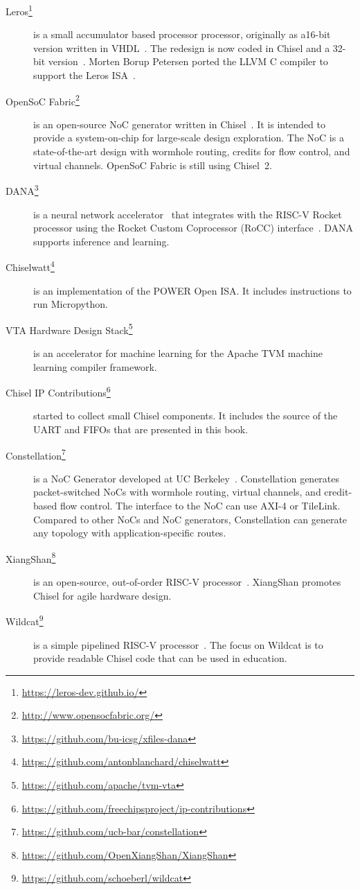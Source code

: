 \documentclass[%
    10pt,
    headinclude, footexclude,
    openright, %
    notitlepage,
    cleardoubleempty,
    headsepline,
    pointlessnumbers,
    bibtotoc, idxtotoc,
    ]{scrbook}
\newcommand{\myref}[2]{\href{#1}{#2}}
\renewcommand{\myref}[2]{{#2}{\footnote{\url{#1}}}}
\begin{document}
\begin{description}
\item[\myref{https://leros-dev.github.io/}{Leros}] is a small accumulator based processor
processor, originally as a16-bit version written in VHDL~\cite{leros:fpl2011}.
The redesign is now coded in Chisel and a 32-bit version~\cite{leros:arcs2019}.
Morten Borup Petersen ported the LLVM C compiler to support the Leros ISA~\cite{leros:comp:2019}.


\item[\myref{http://www.opensocfabric.org/}{OpenSoC Fabric}] is an open-source NoC
generator written in Chisel~\cite{OpenSoC:ispass2016}. It is intended to provide a
system-on-chip for large-scale design exploration.
The NoC is a state-of-the-art design with wormhole routing, credits for flow control, and virtual channels.
OpenSoC Fabric is still using Chisel~2.

\item[\myref{https://github.com/bu-icsg/xfiles-dana}{DANA}] is a neural network accelerator~\cite{eldridge2015}
that integrates with the RISC-V Rocket processor using the Rocket Custom Coprocessor (RoCC) interface~\cite{RoCC:2015}.
DANA supports inference and learning.

\item[\myref{https://github.com/antonblanchard/chiselwatt}{Chiselwatt}] is an implementation
of the POWER Open ISA. It includes instructions to run Micropython.

\item[\myref{https://github.com/apache/tvm-vta}{VTA Hardware Design Stack}] is an accelerator for
machine learning for the Apache TVM machine learning compiler framework.

\item[\myref{https://github.com/freechipsproject/ip-contributions}{Chisel IP Contributions}]
started to collect small Chisel components. It includes the source of the
UART and FIFOs that are presented in this book.

\item[\myref{https://github.com/ucb-bar/constellation}{Constellation}] is a NoC Generator
developed at UC Berkeley~\cite{Constellation:2022}.
Constellation generates packet-switched NoCs with wormhole routing,
virtual channels, and credit-based flow control. The interface to the NoC
can use AXI-4 or TileLink. Compared to other NoCs and NoC generators,
Constellation can generate any topology with application-specific routes.

\item[\myref{https://github.com/OpenXiangShan/XiangShan}{XiangShan}] is an open-source,
out-of-order RISC-V processor~\cite{micro2022xiangshan}.
XiangShan promotes Chisel for agile hardware design.

\item[\myref{https://github.com/schoeberl/wildcat}{Wildcat}]  is a simple pipelined
RISC-V processor~\cite{wildcat:2024}. The focus on Wildcat is to provide readable
Chisel code that can be used in education.

\end{description}
\end{document}
